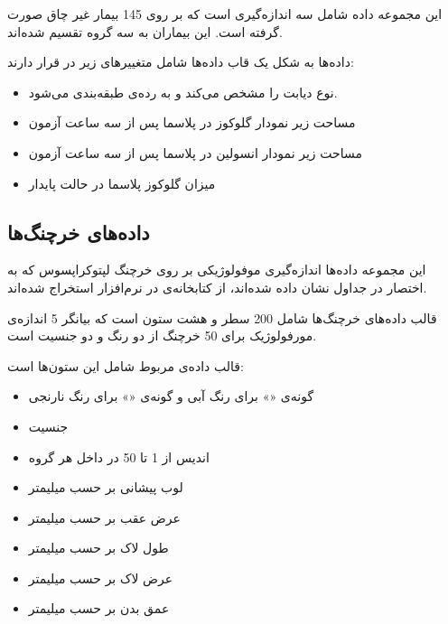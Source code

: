 این مجموعه داده شامل سه اندازه‌گیری است که بر روی 145 بیمار غیر چاق صورت گرفته است. این بیماران به سه گروه تقسیم شده‌اند.

داده‌ها به شکل یک قاب داده‌ها شامل متغییرهای زیر در 
قرار دارند:

\begin{itemize}
\item
{}
نوع دیابت را مشخص می‌کند و به رده‌ی 
طبقه‌بندی می‌شود.
\item
{}
مساحت زیر نمودار گلوکوز در پلاسما پس از سه ساعت آزمون 
\item
{}
مساحت زیر نمودار انسولین در پلاسما پس از سه ساعت آزمون
\item
{}
میزان گلوکوز پلاسما در حالت پایدار
\end{itemize}

\subsection{
داده‌های خرچنگ‌ها
}

این مجموعه داده‌ها اندازه‌گیری موفولوژیکی
بر روی خرچنگ لپتوکراپسوس  که به اختصار
در جداول نشان داده شده‌اند، از کتابخانه‌ی 
\cite{rMASS}
در نرم‌افزار 
استخراج شده‌اند.

قالب داده‌های خرچنگ‌ها شامل 200 سطر و هشت ستون است که بیانگر 5 اندازه‌ی مورفولوژیک برای 50 خرچنگ از دو رنگ و دو جنسیت است.

قالب داده‌ی مربوط شامل این ستون‌ها است:

\begin{itemize}
\item
{}
گونه‌ی «» برای رنگ آبی و گونه‌ی «» برای رنگ نارنجی
\item
{}
جنسیت
\item
{}
اندیس از 1 تا 50 در داخل هر گروه
\item
{}
لوب پیشانی بر حسب میلیمتر
\item
{}
عرض عقب بر حسب میلیمتر
\item
{}
طول لاک بر حسب میلیمتر
\item
{}
عرض لاک بر حسب میلیمتر
\item
{}
عمق بدن بر حسب میلیمتر
\end{itemize}

